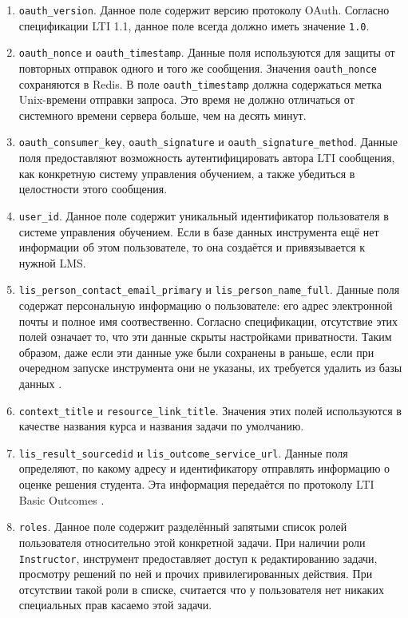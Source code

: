 \documentclass[a4paper,article,14pt]{extarticle}
\begin{document}
\begin{enumerate}
    \item \texttt{oauth\_version}. Данное поле содержит версию протоколу OAuth. Согласно спецификации LTI 1.1, данное поле всегда должно иметь значение \texttt{1.0}.
    \item \texttt{oauth\_nonce} и \texttt{oauth\_timestamp}. Данные поля используются для защиты от повторных отправок одного и того же сообщения. Значения \texttt{oauth\_nonce} сохраняются в Redis. В поле \texttt{oauth\_timestamp} должна содержаться метка Unix-времени отправки запроса. Это время не должно отличаться от системного времени сервера больше, чем на десять минут.
    \item \texttt{oauth\_consumer\_key}, \texttt{oauth\_signature} и \texttt{oauth\_signature\_method}. Данные поля предоставляют возможность аутентифицировать автора LTI сообщения, как конкретную систему управления обучением, а также убедиться в целостности этого сообщения.
    \item \texttt{user\_id}. Данное поле содержит уникальный идентификатор пользователя в системе управления обучением. Если в базе данных инструмента ещё нет информации об этом пользователе, то она создаётся и привязывается к нужной LMS.
    \item \texttt{lis\_person\_contact\_email\_primary} и \texttt{lis\_person\_name\_full}. Данные поля содержат персональную информацию о пользователе: его адрес электронной почты и полное имя соотвественно. Согласно спецификации, отсутствие этих полей означает то, что эти данные скрыты настройками приватности. Таким образом, даже если эти данные уже были сохранены в раньше, если при очередном запуске инструмента они не указаны, их требуется удалить из базы данных \cite{lti}.
    \item \texttt{context\_title} и \texttt{resource\_link\_title}. Значения этих полей используются в качестве названия курса и названия задачи по умолчанию.
    \item \texttt{lis\_result\_sourcedid} и \texttt{lis\_outcome\_service\_url}. Данные поля определяют, по какому адресу и идентификатору отправлять информацию о оценке решения студента. Эта информация передаётся по протоколу LTI Basic Outcomes \cite{ltioutcomes}.
    \item \texttt{roles}. Данное поле содержит разделённый запятыми список ролей пользователя относительно этой конкретной задачи. При наличии роли \texttt{Instructor}, инструмент предоставляет доступ к редактированию задачи, просмотру решений по ней и прочих привилегированных действия. При отсутствии такой роли в списке, считается что у пользователя нет никаких специальных прав касаемо этой задачи.
\end{enumerate}
\end{document}
